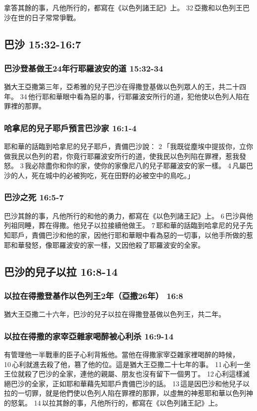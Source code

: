 拿答其餘的事，凡他所行的，都寫在《以色列諸王記》上。 32 亞撒和以色列王巴沙在世的日子常常爭戰。

\subsection{巴沙 15:32-16:7 } 
\subsubsection{巴沙登基做王24年行耶羅波安的道 15:32-34 } 
猶大王亞撒第三年，亞希雅的兒子巴沙在得撒登基做以色列眾人的王，共二十四年。 34 他行耶和華眼中看為惡的事，行耶羅波安所行的道，犯他使以色列人陷在罪裡的那罪。

\subsubsection{哈拿尼的兒子耶戶預言巴沙家 16:1-4} 
耶和華的話臨到哈拿尼的兒子耶戶，責備巴沙說： 2 「我既從塵埃中提拔你，立你做我民以色列的君，你竟行耶羅波安所行的道，使我民以色列陷在罪裡，惹我發怒。 3 我必除盡你和你的家，使你的家像尼八的兒子耶羅波安的家一樣。 4 凡屬巴沙的人，死在城中的必被狗吃，死在田野的必被空中的鳥吃。」

\subsubsection{巴沙之死 16:5-7 } 
巴沙其餘的事，凡他所行的和他的勇力，都寫在《以色列諸王記》上。 6 巴沙與他列祖同睡，葬在得撒。他兒子以拉接續他做王。 7 耶和華的話臨到哈拿尼的兒子先知耶戶，責備巴沙和他的家，因他行耶和華眼中看為惡的一切事，以他手所做的惹耶和華發怒，像耶羅波安的家一樣，又因他殺了耶羅波安的全家。

\subsection{巴沙的兒子以拉 16:8-14 }
\subsubsection{以拉在得撒登基作以色列王2年（亞撒26年） 16:8 } 
猶大王亞撒二十六年，巴沙的兒子以拉在得撒登基做以色列王，共二年。

\subsubsection{以拉在得撒的家宰亞雜家喝醉被心利杀 16:9-14 } 
有管理他一半戰車的臣子心利背叛他。當他在得撒家宰亞雜家裡喝醉的時候， 10 心利就進去殺了他，篡了他的位。這是猶大王亞撒二十七年的事。 11 心利一坐王位就殺了巴沙的全家，連他的親屬、朋友也沒有留下一個男丁。 12 心利這樣滅絕巴沙的全家，正如耶和華藉先知耶戶責備巴沙的話。 13 這是因巴沙和他兒子以拉的一切罪，就是他們使以色列人陷在罪裡的那罪，以虛無的神惹耶和華以色列神的怒氣。 14 以拉其餘的事，凡他所行的，都寫在《以色列諸王記》上。

